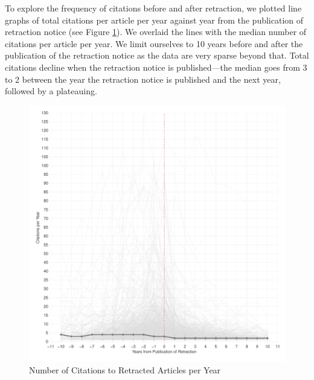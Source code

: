 \documentclass[12pt, letterpaper]{article}
\begin{document}
To explore the frequency of citations before and after retraction, we plotted line graphs of total citations per article per year against year from the publication of retraction notice (see Figure \ref{fig:pre_post_retraction}). We overlaid the lines with the median number of citations per article per year. We limit ourselves to 10 years before and after the publication of the retraction notice as the data are very sparse beyond that. Total citations decline when the retraction notice is published---the median goes from 3 to 2 between the year the retraction notice is published and the next year, followed by a plateauing.

\begin{figure}[H]
\centering
\includegraphics[scale=.7]{../figs/retracted_growth_curve.pdf}
\caption{Number of Citations to Retracted Articles per Year}
\label{fig:pre_post_retraction}
\end{figure}
\end{document}
